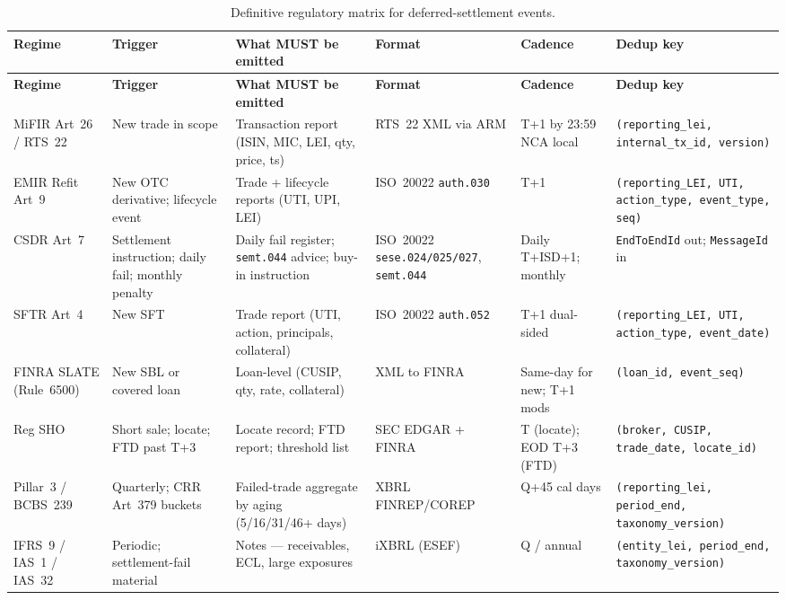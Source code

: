 \documentclass[11pt,a4paper]{article}
\begin{document}
\begin{small}
\begin{longtable}{p{2.6cm}p{2.5cm}p{3.0cm}p{2.0cm}p{1.6cm}p{2.5cm}}
\caption{Definitive regulatory matrix for deferred-settlement events.}\\
\toprule
\textbf{Regime} & \textbf{Trigger} & \textbf{What MUST be emitted} & \textbf{Format} & \textbf{Cadence} & \textbf{Dedup key} \\
\midrule
\endfirsthead
\toprule
\textbf{Regime} & \textbf{Trigger} & \textbf{What MUST be emitted} & \textbf{Format} & \textbf{Cadence} & \textbf{Dedup key} \\
\midrule
\endhead
MiFIR Art~26 / RTS~22 & New trade in scope & Transaction report (ISIN, MIC, LEI, qty, price, ts) & RTS~22 XML via ARM & T+1 by 23:59 NCA local & \texttt{(reporting\_lei, internal\_tx\_id, version)} \\
EMIR Refit Art~9 & New OTC derivative; lifecycle event & Trade + lifecycle reports (UTI, UPI, LEI) & ISO~20022 \texttt{auth.030} & T+1 & \texttt{(reporting\_LEI, UTI, action\_type, event\_type, seq)} \\
CSDR Art~7 & Settlement instruction; daily fail; monthly penalty & Daily fail register; \texttt{semt.044} advice; buy-in instruction & ISO~20022 \texttt{sese.024/025/027}, \texttt{semt.044} & Daily T+ISD+1; monthly & \texttt{EndToEndId} out; \texttt{MessageId} in \\
SFTR Art~4 & New SFT & Trade report (UTI, action, principals, collateral) & ISO~20022 \texttt{auth.052} & T+1 dual-sided & \texttt{(reporting\_LEI, UTI, action\_type, event\_date)} \\
FINRA SLATE (Rule~6500) & New SBL or covered loan & Loan-level (CUSIP, qty, rate, collateral) & XML to FINRA & Same-day for new; T+1 mods & \texttt{(loan\_id, event\_seq)} \\
Reg SHO & Short sale; locate; FTD past T+3 & Locate record; FTD report; threshold list & SEC EDGAR + FINRA & T (locate); EOD T+3 (FTD) & \texttt{(broker, CUSIP, trade\_date, locate\_id)} \\
Pillar~3 / BCBS~239 & Quarterly; CRR Art~379 buckets & Failed-trade aggregate by aging (5/16/31/46+ days) & XBRL FINREP/COREP & Q+45 cal days & \texttt{(reporting\_lei, period\_end, taxonomy\_version)} \\
IFRS~9 / IAS~1 / IAS~32 & Periodic; settlement-fail material & Notes --- receivables, ECL, large exposures & iXBRL (ESEF) & Q / annual & \texttt{(entity\_lei, period\_end, taxonomy\_version)} \\
\bottomrule
\end{longtable}
\end{small}
\end{document}
